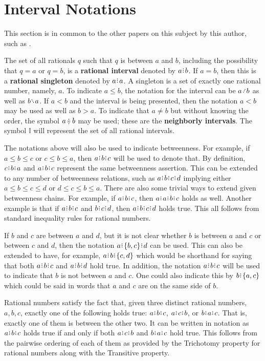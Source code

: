 \documentclass[12pt]{article}
\begin{document}
\section{Interval Notations}

This section is in common to the other papers on this subject by this author, such as \cite{taylor24dedekind}.

The set of all rationals $q$ such that $q$ is between $a$ and $b$, including the possibility that $q=a$ or $q=b$, is a \textbf{rational interval} denoted by $a\rint b$. If $a=b$, then this is a \textbf{rational singleton} denoted by $a\rint a$. A singleton is a set of exactly one rational number, namely, $a$. To indicate $a \leq b$, the notation for the interval can be $a \lte b$ as well as $b \gte a$. If $a < b$ and the interval is being presented, then the notation $a \lt b$ may be used as well as $b \gt a$. To indicate that $a \neq b$ but without knowing the order, the symbol $a \betneq b$ may be used; these are the \textbf{neighborly intervals}. The symbol $\mathbb{I}$ will represent the set of all rational intervals. 

The notations above will also be used to indicate betweenness. For example, if $a \leq b \leq c$ or $c \leq b \leq a$, then $a\rint b\rint c$ will be used to denote that. By definition, $c\rint b\rint a$ and $a\rint b\rint c$ represent the same betweenness assertion. This can be extended to any number of betweenness relations, such as $a\rint b\rint c\rint d$ implying either $a \leq b \leq c \leq d$ or $d \leq c \leq b \leq a$. There are also some trivial ways to extend given betweenness chains. For example, if $a\rint b\rint c$, then $a\rint a\rint b\rint c$ holds as well. Another example is that if $a\rint b\rint c$ and $b\rint c\rint d$, then $a\rint b\rint c\rint d$ holds true. This all follows from standard inequality rules for rational numbers. 

If $b$ and $c$ are between $a$ and $d$, but it is not clear whether $b$ is between $a$ and $c$ or between $c$ and $d$, then the notation $a\rint \{b,c\}\rint d$ can be used. This can also be extended to have, for example, $a\rint b\rint \{c,d\}$ which would be shorthand for saying that both $a\rint b\rint c$ and $a\rint b\rint d$ hold true. In addition, the notation \sout{$a\rint b\rint c$} will be used to indicate that $b$ is not between $a$ and $c$. One could also indicate this by $b\rint \{a,c\}$ which could be said in words that $a$ and $c$ are on the same side of $b$. 

Rational numbers satisfy the fact that, given three distinct rational numbers, $a, b, c$, exactly one of the following holds true:  $a\rint b\rint c$, $a\rint c\rint b$, or $b\rint a\rint c$. That is, exactly one of them is between the other two. It can be written in notation as $a\rint b\rint c$ holds true if and only if both \sout{$a\rint c\rint b$} and \sout{$b\rint a\rint c$} hold true. This follows from the pairwise ordering of each of them as provided by the Trichotomy property for rational numbers along with the Transitive property. 
\end{document}
